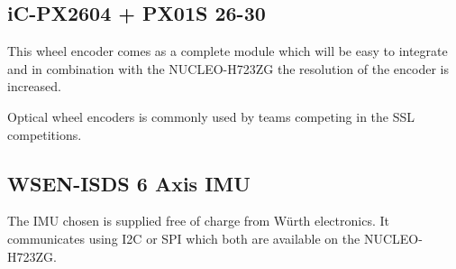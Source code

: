 \documentclass[a4paper,8pt]{article}
\begin{document}
%
%
%
%
\subsection{iC-PX2604 + PX01S 26-30}

This wheel encoder comes as a complete module which will be easy to
integrate and in combination with the NUCLEO-H723ZG the resolution of
the encoder is increased.

Optical wheel encoders is commonly used by teams competing in the SSL competitions.

%
%
%
\subsection{WSEN-ISDS 6 Axis IMU}

The IMU chosen is supplied free of charge from Würth
electronics. It communicates using I2C or SPI which both are available
on the NUCLEO-H723ZG.
\end{document}
